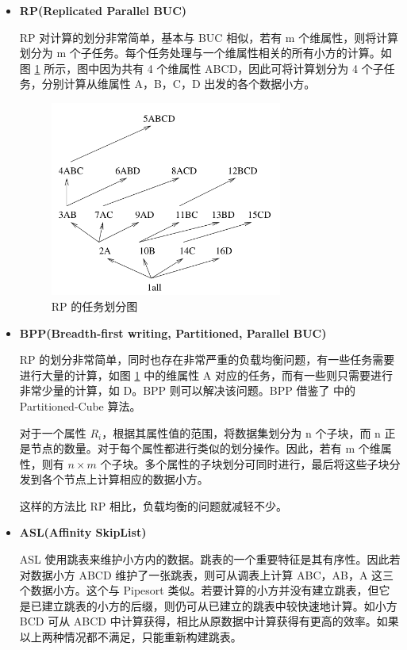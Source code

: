 \begin{itemize}

\item \textbf{RP(Replicated Parallel BUC)}

RP 对计算的划分非常简单，基本与 BUC 相似，若有 m 个维属性，则将计算划分为 m 个子任务。每个任务处理与一个维属性相关的所有小方的计算。如图 \ref{cluster_rp} 所示，图中因为共有 4 个维属性 ABCD，因此可将计算划分为 4 个子任务，分别计算从维属性 A，B，C，D 出发的各个数据小方。

\begin{figure}[!htb]
\centering\includegraphics[width=3in]{picture/ch_current_research/cluster_rp} 
\caption{RP 的任务划分图}\label{cluster_rp} 
\end{figure} 

\item \textbf{BPP(Breadth-first writing, Partitioned, Parallel BUC)}

RP 的划分非常简单，同时也存在非常严重的负载均衡问题，有一些任务需要进行大量的计算，如图 \ref{cluster_rp} 中的维属性 A 对应的任务，而有一些则只需要进行非常少量的计算，如 D。BPP 则可以解决该问题。BPP 借鉴了 \cite{ross1997fast} 中的 Partitioned-Cube 算法。

对于一个属性 ${R}_{i}$，根据其属性值的范围，将数据集划分为 n 个子块，而 n 正是节点的数量。对于每个属性都进行类似的划分操作。因此，若有 m 个维属性，则有 $n \times m$ 个子块。多个属性的子块划分可同时进行，最后将这些子块分发到各个节点上计算相应的数据小方。

这样的方法比 RP 相比，负载均衡的问题就减轻不少。

\item \textbf{ASL(Affinity SkipList)}

ASL 使用跳表来维护小方内的数据。跳表的一个重要特征是其有序性。因此若对数据小方 ABCD 维护了一张跳表，则可从调表上计算 ABC，AB，A 这三个数据小方。这个与 Pipesort 类似。若要计算的小方并没有建立跳表，但它是已建立跳表的小方的后缀，则仍可从已建立的跳表中较快速地计算。如小方 BCD 可从 ABCD 中计算获得，相比从原数据中计算获得有更高的效率。如果以上两种情况都不满足，只能重新构建跳表。
 

\end{itemize}

